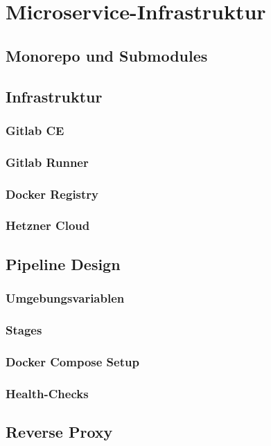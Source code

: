 \chapter{Microservice-Infrastruktur}

\section{Monorepo und Submodules}

\section{Infrastruktur}
\subsection{Gitlab CE}
\subsection{Gitlab Runner}
\subsection{Docker Registry}
\subsection{Hetzner Cloud}

\section{Pipeline Design}
\subsection{Umgebungsvariablen}

\subsection{Stages}
\subsection{Docker Compose Setup}

\subsection{Health-Checks}

\section{Reverse Proxy}

